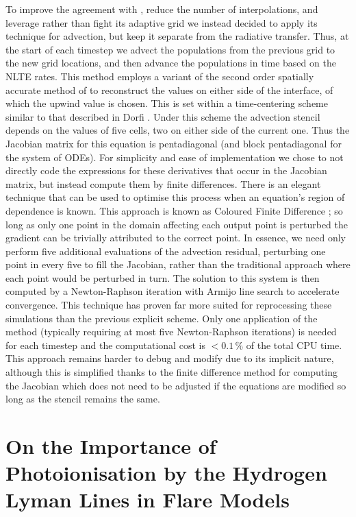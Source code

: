 To improve the agreement with \Radyn{}, reduce the number of interpolations, and leverage rather than fight its adaptive grid we instead decided to apply its technique for advection, but keep it separate from the radiative transfer.
Thus, at the start of each timestep we advect the populations from the previous grid to the new grid locations, and then advance the populations in time based on the NLTE rates.
This method employs a variant of the second order spatially accurate method of \citet{VanLeer1979} to reconstruct the values on either side of the interface, of which the upwind value is chosen.
This is set within a time-centering scheme similar to that described in Dorfi \NeedRef{}.
Under this scheme the advection stencil depends on the values of five cells, two on either side of the current one.
Thus the Jacobian matrix for this equation is pentadiagonal (and block pentadiagonal for the system of ODEs).
For simplicity and ease of implementation we chose to not directly code the expressions for these derivatives that occur in the Jacobian matrix, but instead compute them by finite differences.
There is an elegant technique that can be used to optimise this process when an equation's region of dependence is known.
This approach is known as Coloured Finite Difference \citep{Curtis1974}; so long as only one point in the domain affecting each output point is perturbed the gradient can be trivially attributed to the correct point.
In essence, we need only perform five additional evaluations of the advection residual, perturbing one point in every five to fill the Jacobian, rather than the traditional approach where each point would be perturbed in turn.
The solution to this system is then computed by a Newton-Raphson iteration with Armijo line search \NeedRef{} to accelerate convergence.
This technique has proven far more suited for reprocessing these simulations than the previous explicit scheme.
Only one application of the method (typically requiring at most five Newton-Raphson iterations) is needed for each timestep and the computational cost is $<0.1\,\%$ of the total CPU time.
This approach remains harder to debug and modify due to its implicit nature, although this is simplified thanks to the finite difference method for computing the Jacobian which does not need to be adjusted if the equations are modified so long as the stencil remains the same.

\section{On the Importance of \Caii{} Photoionisation by the Hydrogen Lyman Lines in Flare Models}

